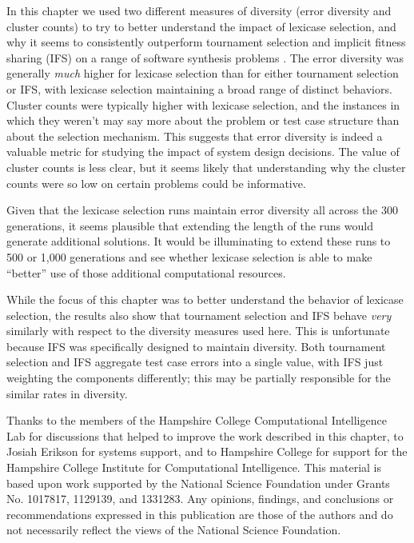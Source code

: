 In this chapter we used two different measures of diversity (error diversity and cluster counts) to try to better understand the impact of lexicase selection, and why it seems to consistently outperform tournament selection and implicit fitness sharing (IFS) on a range of software synthesis problems \citep{Helmuth:2015:GECCO}. The error diversity was generally \emph{much} higher for lexicase selection than for either tournament selection or IFS, with lexicase selection maintaining a broad range of distinct behaviors. Cluster counts were typically higher with lexicase selection, and the instances in which they weren't may say more about the problem or test case structure than about the selection mechanism. This suggests that error diversity is indeed a valuable metric for studying the impact of system design decisions. The value of cluster counts is less clear, but it seems likely that understanding why the cluster counts were so low on certain problems could be informative.

Given that the lexicase selection runs maintain error diversity all across the 300 generations, it seems plausible that extending the length of the runs would generate additional solutions. It would be illuminating to extend these runs to 500 or 1,000 generations and see whether lexicase selection is able to make ``better'' use of those additional computational resources.

While the focus of this chapter was to better understand the behavior of lexicase selection, the results also show that tournament selection and IFS behave \emph{very} similarly with respect to the diversity measures used here. This is unfortunate because IFS was specifically designed to maintain diversity. Both tournament selection and IFS aggregate test case errors into a single value, with IFS just weighting the components differently; this may be partially responsible for the similar rates in diversity. 

\begin{acknowledgement}
	Thanks to the members of the Hampshire College Computational Intelligence Lab for discussions that helped to improve the work described in this chapter, to Josiah Erikson for systems support, and to Hampshire College for support for the Hampshire College Institute for Computational Intelligence. This material is based upon work supported by the National Science Foundation under Grants No. 1017817, 1129139, and 1331283. Any opinions, findings, and conclusions or recommendations expressed in this publication are those of the authors and do not necessarily reflect the views of the National Science Foundation.
\end{acknowledgement}



